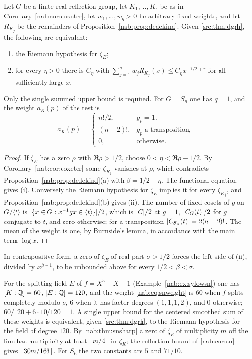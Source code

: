 \begin{theorem}\label{nab:thm:reftest}
Let $G$ be a finite real reflection group, let $K_1,\dots,K_q$ be as in
Corollary~\ref{nab:cor:coxeter}, let $w_1,\dots,w_q>0$ be arbitrary fixed weights, and let
$R_{K_j}$ be the remainders of Proposition~\ref{nab:prop:dedekind}. Given \cref{src:thm:dgrh}, the
following are equivalent:
\begin{enumerate}[label=\textup{(\roman*)}]
\item the Riemann hypothesis for $\zeta_E$;
\item for every $\eta>0$ there is $C_\eta$ with
$\sum_{j=1}^qw_jR_{K_j}(x)\le C_\eta x^{-1/2+\eta}$ for all sufficiently large $x$.
\end{enumerate}
Only the single summed upper bound is required. For $G=S_n$ one has $q=1$, and the weight
$a_K(p)$ of the test is
\begin{equation}\label{nab:eq:snweight}
 a_K(p)=\begin{cases}n!/2,&g_p=1,\\ (n-2)!,&g_p\text{ a transposition},\\ 0,&\text{otherwise}.\end{cases}
\end{equation}
\end{theorem}
\begin{proof}
If $\zeta_E$ has a zero $\rho$ with $\Re\rho>1/2$, choose $0<\eta<\Re\rho-1/2$. By
Corollary~\ref{nab:cor:coxeter} some $\zeta_{K_j}$ vanishes at $\rho$, which contradicts
Proposition~\ref{nab:prop:dedekind}(a) with $\beta=1/2+\eta$. The functional equation gives (i).
Conversely the Riemann hypothesis for $\zeta_E$ implies it for every $\zeta_{K_j}$, and
Proposition~\ref{nab:prop:dedekind}(b) gives (ii). The number of fixed cosets of $g$ on
$G/\langle t\rangle$ is $\lvert\{x\in G:x^{-1}gx\in\langle t\rangle\}\rvert/2$, which is
$\lvert G\rvert/2$ at $g=1$, $\lvert C_G(t)\rvert/2$ for $g$ conjugate to $t$, and zero otherwise; for a
transposition $\lvert C_{S_n}(t)\rvert=2(n-2)!$. The mean of the weight is one, by Burnside's
lemma, in accordance with the main term $\log x$.
\end{proof}

In contrapositive form, a zero of $\zeta_E$ of real part $\sigma>1/2$ forces the left side
of (ii), divided by $x^{\beta-1}$, to be unbounded above for every $1/2<\beta<\sigma$.

\begin{example}\label{nab:ex:quintic}
For the splitting field $E$ of $f=X^5-X-1$ (Example~\ref{nab:ex:sylowsn}) one has
$[K:\mathbb{Q}]=60$, $[E:\mathbb{Q}]=120$, and the weight \eqref{nab:eq:snweight} is $60$ when $f$ splits
completely modulo $p$, $6$ when it has factor degrees $(1,1,1,2)$, and $0$ otherwise;
$60/120+6\cdot10/120=1$. A single upper bound for the centered smoothed sum of these
weights is equivalent, given \cref{src:thm:dgrh}, to the Riemann hypothesis for the field
of degree $120$. By \cref{nab:thm:snsharp} a zero of $\zeta_E$ of multiplicity $m$ off the
line has multiplicity at least $\lceil m/4\rceil$ in $\zeta_K$; the reflection bound of
\cref{nab:cor:sn} gives $\lceil30m/163\rceil$. For $S_6$ the two constants are $5$ and $71/10$.
\end{example}



